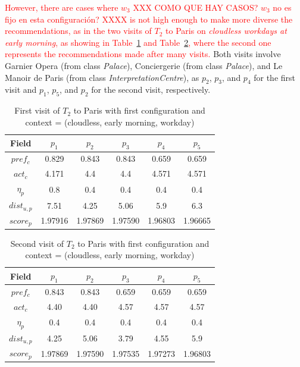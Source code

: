 \textcolor{red}{However, there are cases where $w_3$ XXX COMO QUE HAY CASOS?  $w_3$ no es fijo en esta configuración? XXXX is not high enough to make more diverse the recommendations, as in the two visits of $T_2$ to Paris on {\it  cloudless workdays at early morning}, as showing in Table~\ref{table:t2-3} and Table~\ref{table:t2-4}, where the second one represents the recommendations made after many visits. }
Both visits involve Garnier Opera (from class \textit{Palace}), Conciergerie (from class \textit{Palace}), and Le Manoir de Paris (from class \textit{InterpretationCentre}), as $p_2$, $p_3$, and $p_4$ for the first visit and $p_1$, $p_5$, and $p_2$ for the second visit, respectively.

\begin{table}[h!]
    \centering
        \caption{First visit of $T_2$ to Paris with first configuration and context = (cloudless, early morning, workday)}
    \label{table:t2-3}
    \begin{tabular}{ |c|c|c|c|c|c| } 
        \hline
        Field   & $p_1$ & $p_2$ & $p_3$ & $p_4$ & $p_5$ \\
        \hline
        $pref_c$    &  0.829 & 0.843 & 0.843 & 0.659 & 0.659 \\
        $act_c$     & 4.171 & 4.4 & 4.4 & 4.571 & 4.571 \\
        $\eta_p$    & 0.8 & 0.4 & 0.4 & 0.4 & 0.4 \\
        $dist_{u,p}$ & 7.51 & 4.25 & 5.06 & 5.9 & 6.3 \\
        $score_p$    & 1.97916 & 1.97869 & 1.97590 & 1.96803 & 1.96665 \\
        
        \hline
    \end{tabular}
\end{table}

\begin{table}[h!]
    \centering
        \caption{Second visit of $T_2$ to Paris with first configuration and context = (cloudless,  early morning, workday)}
    \label{table:t2-4}
    \begin{tabular}{ |c|c|c|c|c|c| } 
        \hline
        Field   & $p_1$ & $p_2$ & $p_3$ & $p_4$ & $p_5$ \\
        \hline
        $pref_c$    &  0.843 & 0.843 & 0.659 & 0.659 & 0.659 \\
        $act_c$     & 4.40 & 4.40 & 4.57 & 4.57 & 4.57  \\
        $\eta_p$    & 0.4 & 0.4 & 0.4 & 0.4 & 0.4 \\
        $dist_{u,p}$ & 4.25 & 5.06 & 3.79 & 4.55 & 5.9 \\
        $score_p$    & 1.97869 & 1.97590 & 1.97535 & 1.97273 & 1.96803 \\
        
        \hline
    \end{tabular}
\end{table}

